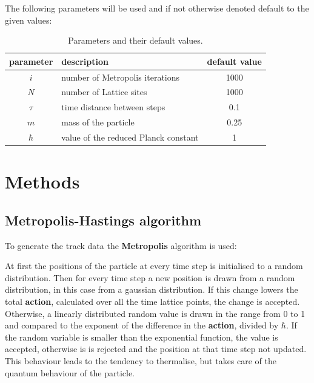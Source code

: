 \documentclass{scrartcl}
\begin{document}
		The following parameters will be used and if not otherwise denoted default to the given values:
		\begin{table}
			\centering
			\begin{tabular}{c|l|c}
				parameter & description & default value\\
				\hline
				$i$ & number of Metropolis iterations & 1000\\
				$N$ & number of Lattice sites & 1000\\
				$\tau$ & time distance between steps & 0.1\\
				$m$ & mass of the particle & 0.25\\
				$\hbar$ & value of the reduced Planck constant & 1\\
			\end{tabular}
			\caption{Parameters and their default values.}
			\label{eq:parameters}
		\end{table}

	\section{Methods}
	\subsection{Metropolis-Hastings algorithm}
		To generate the track data the \textbf{Metropolis} algorithm is used:

		At first the positions of the particle at every time step is initialised to a random distribution.
		Then for every time step a new position is drawn from a random distribution, in this case from a gaussian distribution.
		If this change lowers the total \textbf{action}, calculated over all the time lattice points, the change is accepted.
		Otherwise, a linearly distributed random value is drawn in the range from 0 to 1 and compared to the exponent of the difference in the \textbf{action}, divided by $\hbar$.
		If the random variable is smaller than the exponential function, the value is accepted, otherwise is is rejected and the position at that time step not updated.
		This behaviour leads to the tendency to thermalise, but takes care of the quantum behaviour of the particle.
\end{document}
